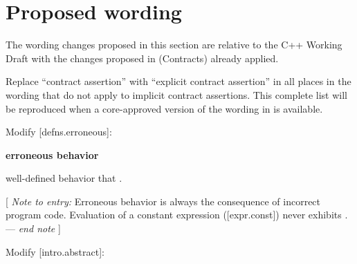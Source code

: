\pagebreak

\section{Proposed wording}

The wording changes proposed in this section are relative to the C++ Working Draft \cite{N5001} with the changes proposed in \cite{P2900R13} (Contracts) already applied. 


Replace ``contract assertion'' with ``explicit contract assertion'' in all places in the wording that do not apply to implicit contract assertions.  This complete list will be reproduced when a core-approved version of the wording in \cite{P2900R13} is available.

Modify [defns.erroneous]:

\begin{adjustwidth}{0.5cm}{0.5cm}
\textbf{erroneous behavior}

well-defined behavior that .

[ \emph{Note to entry:} Erroneous behavior is always the consequence of incorrect program code.  Evaluation of a constant expression ([expr.const]) never exhibits .--- \emph{end note} ]
\end{adjustwidth}

Modify [intro.abstract]:

